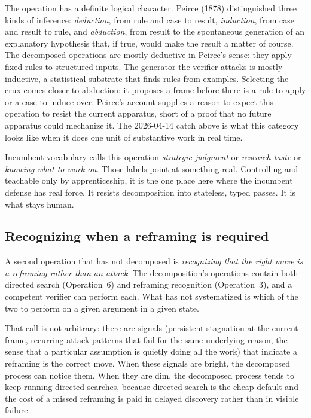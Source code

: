 \documentclass[
  11pt,
]{article}
\begin{document}
The operation has a definite logical character. Peirce (1878)
distinguished three kinds of inference: \emph{deduction}, from rule and
case to result, \emph{induction}, from case and result to rule, and
\emph{abduction}, from result to the spontaneous generation of an
explanatory hypothesis that, if true, would make the result a matter of
course. The decomposed operations are mostly deductive in Peirce's sense:
they apply fixed rules to structured inputs. The generator the verifier
attacks is mostly inductive, a statistical substrate that finds rules from
examples. Selecting the crux comes closer to abduction: it
proposes a frame before there is a rule to apply or a case to induce over.
Peirce's account supplies a reason to expect this operation to resist the
current apparatus, short of a proof that no future apparatus could
mechanize it. The 2026-04-14 catch above is what this category looks like
when it does one unit of substantive work in real time.

Incumbent vocabulary calls this operation \emph{strategic judgment} or
\emph{research taste} or \emph{knowing what to work on}. Those labels
point at something real. Controlling and teachable only by apprenticeship,
it is the one place here where the incumbent defense has real force. It
resists decomposition into stateless, typed passes. It is what stays
human.

\subsection{Recognizing when a reframing is
required}\label{recognizing-when-a-reframing-is-required}

A second operation that has not decomposed is \emph{recognizing that the
right move is a reframing rather than an attack}. The decomposition's
operations contain both directed search (Operation~6) and reframing
recognition (Operation~3), and a competent verifier can perform each. What
has not systematized is which of the two to perform on a given argument in
a given state.

That call is not arbitrary: there are signals (persistent stagnation at
the current frame, recurring attack patterns that fail for the same
underlying reason, the sense that a particular assumption is quietly doing
all the work) that indicate a reframing is the correct move. When
these signals are bright, the decomposed process can notice them. When
they are dim, the decomposed process tends to keep running directed searches,
because directed search is the cheap default and the cost of a missed
reframing is paid in delayed discovery rather than in visible failure.
\end{document}
